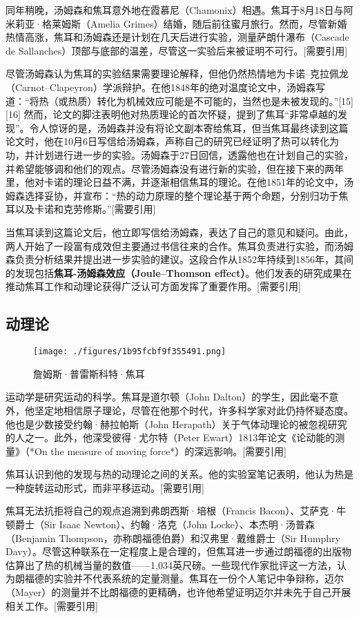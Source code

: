 同年稍晚，汤姆森和焦耳意外地在霞慕尼（Chamonix）相遇。焦耳于8月18日与阿米莉亚·格莱姆斯（Amelia Grimes）结婚，随后前往蜜月旅行。然而，尽管新婚热情高涨，焦耳和汤姆森还是计划在几天后进行实验，测量萨朗什瀑布（Cascade de Sallanches）顶部与底部的温差，尽管这一实验后来被证明不可行。[需要引用]  

尽管汤姆森认为焦耳的实验结果需要理论解释，但他仍然热情地为卡诺–克拉佩龙（Carnot–Clapeyron）学派辩护。在他1848年的绝对温度论文中，汤姆森写道：“将热（或热质）转化为机械效应可能是不可能的，当然也是未被发现的。”[15][16] 然而，论文的脚注表明他对热质理论的首次怀疑，提到了焦耳“非常卓越的发现”。令人惊讶的是，汤姆森并没有将论文副本寄给焦耳，但当焦耳最终读到这篇论文时，他在10月6日写信给汤姆森，声称自己的研究已经证明了热可以转化为功，并计划进行进一步的实验。汤姆森于27日回信，透露他也在计划自己的实验，并希望能够调和他们的观点。尽管汤姆森没有进行新的实验，但在接下来的两年里，他对卡诺的理论日益不满，并逐渐相信焦耳的理论。在他1851年的论文中，汤姆森选择妥协，并宣布：“热的动力原理的整个理论基于两个命题，分别归功于焦耳以及卡诺和克劳修斯。”[需要引用]  

当焦耳读到这篇论文后，他立即写信给汤姆森，表达了自己的意见和疑问。由此，两人开始了一段富有成效但主要通过书信往来的合作。焦耳负责进行实验，而汤姆森负责分析结果并提出进一步实验的建议。这段合作从1852年持续到1856年，其间的发现包括\textbf{焦耳-汤姆森效应（Joule–Thomson effect）}。他们发表的研究成果在推动焦耳工作和动理论获得广泛认可方面发挥了重要作用。[需要引用]
\subsection{动理论}
\begin{figure}[ht]
\centering
\texttt{[image: ./figures/1b95fcbf9f355491.png]}
\caption{詹姆斯·普雷斯科特·焦耳} \label{fig_JR_3}
\end{figure}
运动学是研究运动的科学。焦耳是道尔顿（John Dalton）的学生，因此毫不意外，他坚定地相信原子理论，尽管在他那个时代，许多科学家对此仍持怀疑态度。他也是少数接受约翰·赫拉帕斯（John Herapath）关于气体动理论的被忽视研究的人之一。此外，他深受彼得·尤尔特（Peter Ewart）1813年论文《论动能的测量》（*On the measure of moving force*）的深远影响。[需要引用]  

焦耳认识到他的发现与热的动理论之间的关系。他的实验室笔记表明，他认为热是一种旋转运动形式，而非平移运动。[需要引用]  

焦耳无法抗拒将自己的观点追溯到弗朗西斯·培根（Francis Bacon）、艾萨克·牛顿爵士（Sir Isaac Newton）、约翰·洛克（John Locke）、本杰明·汤普森（Benjamin Thompson，亦称朗福德伯爵）和汉弗里·戴维爵士（Sir Humphry Davy）。尽管这种联系在一定程度上是合理的，但焦耳进一步通过朗福德的出版物估算出了热的机械当量的数值——1,034英尺磅。一些现代作家批评这一方法，认为朗福德的实验并不代表系统的定量测量。焦耳在一份个人笔记中争辩称，迈尔（Mayer）的测量并不比朗福德的更精确，也许他希望证明迈尔并未先于自己开展相关工作。[需要引用]  

